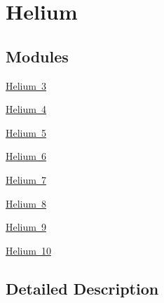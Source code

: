 \hypertarget{group___isotope_const-_helium}{}\section{Helium}
\label{group___isotope_const-_helium}
\subsection*{Modules}
\begin{DoxyCompactItemize}
\item 
\mbox{\hyperlink{group___isotope_const-_helium-_he3}{Helium 3}}
\item 
\mbox{\hyperlink{group___isotope_const-_helium-_he4}{Helium 4}}
\item 
\mbox{\hyperlink{group___isotope_const-_helium-_he5}{Helium 5}}
\item 
\mbox{\hyperlink{group___isotope_const-_helium-_he6}{Helium 6}}
\item 
\mbox{\hyperlink{group___isotope_const-_helium-_he7}{Helium 7}}
\item 
\mbox{\hyperlink{group___isotope_const-_helium-_he8}{Helium 8}}
\item 
\mbox{\hyperlink{group___isotope_const-_helium-_he9}{Helium 9}}
\item 
\mbox{\hyperlink{group___isotope_const-_helium-_he10}{Helium 10}}
\end{DoxyCompactItemize}


\subsection{Detailed Description}
